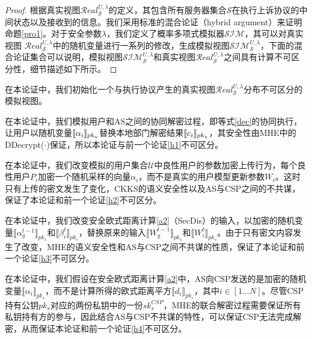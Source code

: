 \begin{proof}
	根据真实视图$\mathcal{R} e a l_{\mathcal{S}}^{U, \lambda}$的定义，其包含所有服务器集合$\mathcal{S}$在执行上诉协议的中间状态以及接收到的信息。我们采用标准的混合论证（hybrid argument）\cite{bonawitz2017practical, xu2020privacy}来证明命题\ref{pro1}。对于安全参数$ \lambda $，我们定义了概率多项式模拟器$\mathcal{SIM}$，其可以对真实视图 $\mathcal{R} e a l_{\mathcal{S}}^{U, \lambda}$中的随机变量进行一系列的修改，生成模拟视图$ \mathcal{S I} \mathcal{M}_{\mathcal{S}}^{U, \lambda} $，下面的混合论证集合可以说明，模拟视图$ \mathcal{S I} \mathcal{M}_{\mathcal{S}}^{U, \lambda} $和真实视图$\mathcal{R} e a l_{\mathcal{S}}^{U, \lambda}$之间具有计算不可区分性，细节描述如下所示。
\end{proof}

\begin{hybrid}\label{h1}
	在本论证中，我们初始化一个与执行协议产生的真实视图$\mathcal{R} e a l_{\mathcal{S}}^{U, \lambda}$分布不可区分的模拟视图。
\end{hybrid}

\begin{hybrid}\label{h2}
	在本论证中，我们模拟用户和AS之间的协同解密过程，即等式\ref{dec}的协同执行，让用户以随机变量$\ctx[pk_u]{\alpha_i}$替换本地部门解密结果$\ctx[pk_u]{c_i}$，其安全性由MHE中的DDecrypt($\cdot$)保证，所以本论证与前一个论证\ref{h1}不可区分。
\end{hybrid}

\begin{hybrid}\label{h3}
	在本论证中，我们改变模拟的用户集合$\mathcal{U}$中良性用户的参数加密上传行为，每个良性用户$P_i$加密一个随机采样的向量$\alpha_i$，而不是真实的用户模型更新参数$W_i$。这时只有上传的密文发生了变化，CKKS的语义安全性以及AS与CSP之间的不共谋，保证了本论证和前一个论证\ref{h2}不可区分。
\end{hybrid}

\begin{hybrid}\label{h4}
	在本论证中，我们改变安全欧式距离计算\ref{a2}（SecDis）的输入，以加密的随机变量$\llbracket \alpha_{g}^{t-1}\rrbracket_{pk_s}$和$\llbracket \beta_i^{t}\rrbracket_{pk_s}$，替换原来的输入$\llbracket W_{g}^{t-1}\rrbracket_{pk_s}$和$\llbracket W_i^{t}\rrbracket_{pk_s}$。由于只有密文内容发生了改变，MHE的语义安全性和AS与CSP之间不共谋的性质，保证了本论证和前一个论证\ref{h3}不可区分。
\end{hybrid}

\begin{hybrid}\label{h5}
	在本论证中，我们假设在安全欧式距离计算\ref{a2}中，AS向CSP发送的是加密的随机变量$\llbracket \alpha_i\rrbracket_{pk_s}$，而不是计算所得的欧式距离平方$\llbracket d_i \rrbracket_{pk_s}$，其中$i \in [1...N]$。尽管CSP持有公钥$pk_s$对应的两份私钥中的一份$sk_s^{CSP}$，MHE的联合解密过程需要保证所有私钥持有方的参与，因此结合AS与CSP不共谋的特性，可以保证CSP无法完成解密，从而保证本论证和前一个论证\ref{h4}不可区分。
\end{hybrid}

